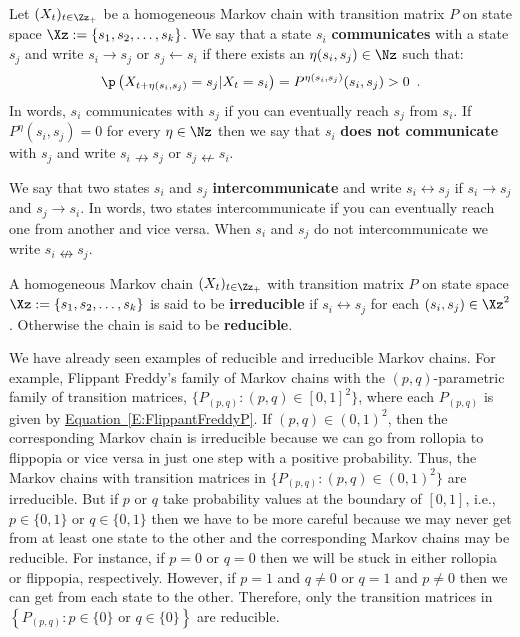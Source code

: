 \begin{definition}\label{D:Communication} Let $(X_t)_{t\in\Zz_+}$ be a homogeneous Markov chain with transition matrix $P$ on state space $\Xz:=\{s_1,s_2,\ldots,s_k\}$.  
We say that a state $s_i$ {\bf communicates} with a state $s_j$ and write $s_i \rightarrow s_j$ or $s_j \leftarrow s_i$ if there exists an $\eta(s_i,s_j) \in \Nz$ such that:
\[
\p \left( X_{t+\eta(s_i,s_j)} = s_j | X_t = s_i \right) = P^{\eta(s_i,s_j)} (s_i, s_j) > 0 \enspace .
\] 
In words, $s_i$ communicates with $s_j$ if you can eventually reach $s_j$ from $s_i$.  If $P^{\eta} (s_i, s_j)=0$ for every $\eta \in \Nz$ then we say that $s_i$ {\bf does not communicate} with $s_j$ and write $s_i  \nrightarrow s_j$ or $s_j  \nleftarrow s_i$.

We say that two states $s_i$ and $s_j$ {\bf intercommunicate} and write $s_i \leftrightarrow s_j$ if $s_i \rightarrow s_j$ and $s_j \rightarrow s_i$.  In words, two states intercommunicate if you can eventually reach one from another and vice versa.  When $s_i$ and $s_j$ do not intercommunicate we write $s_i \nleftrightarrow s_j$.
\end{definition}

\begin{definition}[Irreducible]\label{D:Irreducible}
A homogeneous Markov chain $(X_t)_{t\in\Zz_+}$ with transition matrix $P$ on state space $\Xz:=\{s_1,s_2,\ldots,s_k\}$ is said to be {\bf irreducible} if $s_i \leftrightarrow s_j$ for each $(s_i,s_j) \in \Xz^2$.  Otherwise the chain is said to be {\bf reducible}.
\end{definition}

We have already seen examples of reducible and irreducible Markov chains.  For example, Flippant Freddy's family of Markov chains with the $(p,q)$-parametric family of transition matrices, $\{P_{(p,q)} : (p,q) \in [0,1]^2\}$, where each $P_{(p,q)}$ is given by \hyperref[E:FlippantFreddyP]{Equation~\ref*{E:FlippantFreddyP}}.  If $(p,q) \in (0,1)^2$, then the corresponding Markov chain is irreducible because we can go from rollopia to flippopia or vice versa in just one step with a positive probability.  Thus, the Markov chains with transition matrices in $\{P_{(p,q)} : (p,q) \in (0,1)^2\}$ are irreducible.  But if $p$ or $q$ take probability values at the boundary of $[0,1]$, i.e., $p \in \{0,1\}$ or $q \in \{0,1\}$ then we have to be more careful because we may  never get from at least one state to the other and the corresponding Markov chains may be reducible.   For instance, if $p=0$ or $q=0$ then we will be stuck in either rollopia or flippopia, respectively.  However, if $p=1$ and $q \neq 0$ or $q=1$ and $p \neq 0$ then we can get from each  state to the other.  Therefore,  only the transition matrices in $\left\{P_{(p,q)} : p \in \{0\} \text{ or } q \in \{0\}\right\}$ are reducible.


